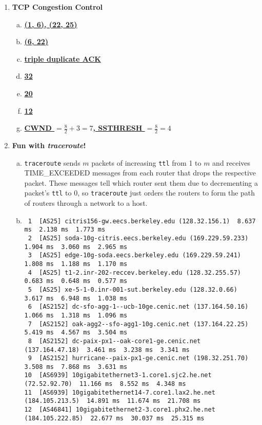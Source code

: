 \documentclass[11pt,fleqn]{article}
\begin{document}
\begin{enumerate}[1.]
\newpage
\item \textbf{TCP Congestion Control}
\begin{enumerate}[(a)]
\item \textbf{\underline{(1, 6), (22, 25)}}
\item \textbf{\underline{(6, 22)}}
\item \textbf{\underline{triple duplicate ACK}}
\item \textbf{\underline{32}}
\item \textbf{\underline{20}}
\item \textbf{\underline{12}}
\item \textbf{\underline{CWND $= \frac82 + 3 = 7$, SSTHRESH $= \frac82 = 4$}}
\end{enumerate}

\newpage
\item \textbf{Fun with \textit{traceroute}!}
\begin{enumerate}[(a)]
\item \verb|traceroute| sends $m$ packets of increasing \verb|ttl| from 1 to $m$ and receives TIME\_EXCEEDED messages from each router that drops the respective packet. These messages tell which router sent them due to decrementing a packet's \verb|ttl| to 0, so \verb|traceroute| just orders the routers to form the path of routers through a network to a host.
\item {\scriptsize \begin{verbatim}
 1  [AS25] citris156-gw.eecs.berkeley.edu (128.32.156.1)  8.637 ms  2.138 ms  1.773 ms
 2  [AS25] soda-10g-citris.eecs.berkeley.edu (169.229.59.233)  1.904 ms  3.060 ms  2.965 ms
 3  [AS25] edge-10g-soda.eecs.berkeley.edu (169.229.59.241)  1.808 ms  1.188 ms  1.170 ms
 4  [AS25] t1-2.inr-202-reccev.berkeley.edu (128.32.255.57)  0.683 ms  0.648 ms  0.577 ms
 5  [AS25] xe-5-1-0.inr-001-sut.berkeley.edu (128.32.0.66)  3.617 ms  6.948 ms  1.038 ms
 6  [AS2152] dc-sfo-agg-1--ucb-10ge.cenic.net (137.164.50.16)  1.066 ms  1.318 ms  1.096 ms
 7  [AS2152] oak-agg2--sfo-agg1-10g.cenic.net (137.164.22.25)  5.419 ms  4.567 ms  3.504 ms
 8  [AS2152] dc-paix-px1--oak-core1-ge.cenic.net (137.164.47.18)  3.461 ms  3.238 ms  3.341 ms
 9  [AS2152] hurricane--paix-px1-ge.cenic.net (198.32.251.70)  3.508 ms  7.868 ms  3.631 ms
10  [AS6939] 10gigabitethernet3-1.core1.sjc2.he.net (72.52.92.70)  11.166 ms  8.552 ms  4.348 ms
11  [AS6939] 10gigabitethernet14-7.core1.lax2.he.net (184.105.213.5)  14.891 ms  11.674 ms  21.708 ms
12  [AS46841] 10gigabitethernet2-3.core1.phx2.he.net (184.105.222.85)  22.677 ms  30.037 ms  25.315 ms

\end{verbatim}}
\end{enumerate}
\end{enumerate}
\end{document}

